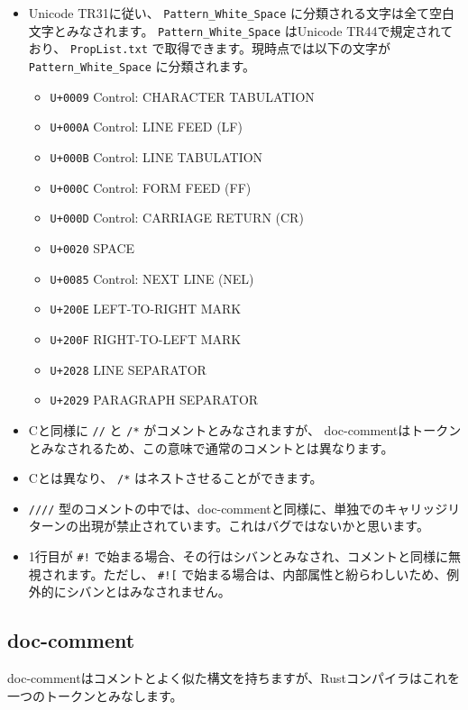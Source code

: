\documentclass[dvipdfmx,uplatex,papersize,a4paper,10pt]{jsbook}
\theoremstyle{definition}
\begin{document}
\begin{itemize}
  \item Unicode TR31に従い、 \verb|Pattern_White_Space| に分類される文字は全て空白文字とみなされます。 \verb|Pattern_White_Space| はUnicode TR44で規定されており、 \verb|PropList.txt| で取得できます。現時点では以下の文字が \verb|Pattern_White_Space| に分類されます。
    \begin{itemize}
      \item \verb|U+0009| Control: CHARACTER TABULATION
      \item \verb|U+000A| Control: LINE FEED (LF)
      \item \verb|U+000B| Control: LINE TABULATION
      \item \verb|U+000C| Control: FORM FEED (FF)
      \item \verb|U+000D| Control: CARRIAGE RETURN (CR)
      \item \verb|U+0020| SPACE
      \item \verb|U+0085| Control: NEXT LINE (NEL)
      \item \verb|U+200E| LEFT-TO-RIGHT MARK
      \item \verb|U+200F| RIGHT-TO-LEFT MARK
      \item \verb|U+2028| LINE SEPARATOR
      \item \verb|U+2029| PARAGRAPH SEPARATOR
    \end{itemize}
  \item Cと同様に \verb|//| と \verb|/*| がコメントとみなされますが、 doc-commentはトークンとみなされるため、この意味で通常のコメントとは異なります。
  \item Cとは異なり、 \verb|/*| はネストさせることができます。
  \item \verb|////| 型のコメントの中では、doc-commentと同様に、単独でのキャリッジリターンの出現が禁止されています。これはバグではないかと思います。
  \item 1行目が \verb|#!| で始まる場合、その行はシバンとみなされ、コメントと同様に無視されます。ただし、 \verb|#![| で始まる場合は、内部属性と紛らわしいため、例外的にシバンとはみなされません。
\end{itemize}

\subsection{doc-comment}

doc-commentはコメントとよく似た構文を持ちますが、Rustコンパイラはこれを一つのトークンとみなします。
\end{document}
